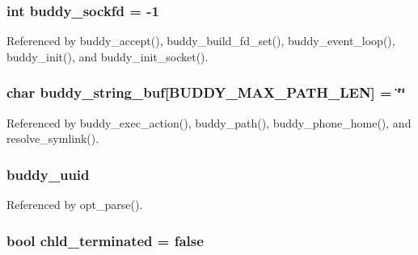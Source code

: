 \subsubsection[{buddy\_\-sockfd}]{\setlength{\rightskip}{0pt plus 5cm}int {\bf buddy\_\-sockfd} = -\/1\hspace{0.3cm}{\ttfamily  [static]}}\label{buddy_8c_ab8ae7575757371a277bb048389ca9f84}


Referenced by buddy\_\-accept(), buddy\_\-build\_\-fd\_\-set(), buddy\_\-event\_\-loop(), buddy\_\-init(), and buddy\_\-init\_\-socket().

\subsubsection[{buddy\_\-string\_\-buf}]{\setlength{\rightskip}{0pt plus 5cm}char {\bf buddy\_\-string\_\-buf}[BUDDY\_\-MAX\_\-PATH\_\-LEN] = \char`\"{}\char`\"{}\hspace{0.3cm}{\ttfamily  [static]}}\label{buddy_8c_a12b4e74d3f481815831cbeb5cde0d996}


Referenced by buddy\_\-exec\_\-action(), buddy\_\-path(), buddy\_\-phone\_\-home(), and resolve\_\-symlink().

\subsubsection[{buddy\_\-uuid}]{ {\bf buddy\_\-uuid}}\label{buddy_8c_a3e9321d881ca257289c65b5022b693c8}


Referenced by opt\_\-parse().

\subsubsection[{chld\_\-terminated}]{\setlength{\rightskip}{0pt plus 5cm}bool {\bf chld\_\-terminated} = false\hspace{0.3cm}{\ttfamily  [static]}}\label{buddy_8c_ac7d1b197ce100f66f7fd13dc10b94154}


